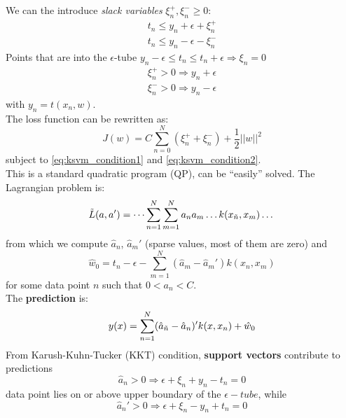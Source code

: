 We can the introduce \textit{slack variables} $\xi_{n}^{+}, \xi_{n}^{-} \geq 0$:
\begin{equation}
\label{eq:ksvm_condition1}
    \begin{multlined}
        t_{n} \leq y_{n} + \epsilon + \xi_{n}^{+} \\
        t_{n} \leq y_{n} - \epsilon - \xi_{n}^{-}
    \end{multlined}
\end{equation}
Points that are into the $\epsilon$-tube $y_{n} - \epsilon \leq t_{n} \leq t_{n} + \epsilon \Rightarrow \xi_{n} = 0$
\begin{equation}
\label{eq:ksvm_condition2}
    \begin{multlined}
        \xi_{n}^{+} > 0 \Rightarrow y_{n} + \epsilon \\
        \xi_{n}^{-} > 0 \Rightarrow y_{n} - \epsilon
    \end{multlined}
\end{equation}
with $y_{n} = t(x_{n}, w)$. \\
The loss function can be rewritten as:
\begin{equation}
    J(w) = C\sum_{n=0}^{N}(\xi^{+}_{n} + \xi^{-}_{n}) + \frac{1}{2}||w||^{2}
\end{equation}
subject to \ref{eq:ksvm_condition1} and \ref{eq:ksvm_condition2}.\\
This is a standard quadratic program (QP), can be “easily” solved.
The Lagrangian problem is:
\begin{equation}
    \Tilde{L}(a, a') = \dots \sum_{n=1}^{N}\sum_{m=1}^{N}a_{n}a_{m}\dots k(x_{\Tilde{n}}, x_{m}) \dots
\end{equation}
from which we compute $\hat{a}_{n}$, $\hat{a}_{m}'$ (sparse values, most of them are zero) and
\begin{equation}
    \hat{w}_{0} = t_{n} - \epsilon - \sum_{m=1}^{N}(\hat{a}_{m} - \hat{a}_{m}')k(x_{n},x_{m})
\end{equation}
for some data point $n$ such that $0 < a_{n} < C$. \\
The \textbf{prediction} is:
\begin{equation}
    y(x) = \sum_{n=1}^{N}(\hat{a}_{\Tilde{n}} - \hat{a}_{n})'k(x, x_{n}) + \hat{w}_{0}
\end{equation}
From Karush-Kuhn-Tucker (KKT) condition, \textbf{support vectors} contribute to predictions
\[\hat{a}_{n} > 0 \Rightarrow \epsilon + \xi_{n} + y_{n} - t_{n} = 0\]
data point lies on or above upper boundary of the $\epsilon-tube$, while
\[\hat{a}_{n}' > 0 \Rightarrow \epsilon + \xi_{n} - y_{n} + t_{n} = 0\]
